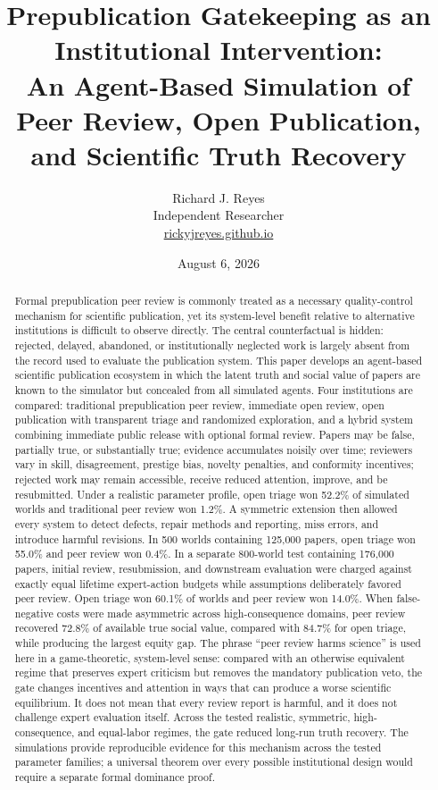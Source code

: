 \documentclass[11pt]{article}
\title{\textbf{Prepublication Gatekeeping as an Institutional Intervention:}\\
An Agent-Based Simulation of Peer Review, Open Publication, and Scientific Truth Recovery}
\author{Richard J. Reyes\\
Independent Researcher\\
\href{https://rickyjreyes.github.io}{rickyjreyes.github.io}}
\date{August 6, 2026}
\begin{document}
\maketitle

\begin{abstract}
Formal prepublication peer review is commonly treated as a necessary quality-control mechanism for scientific publication, yet its system-level benefit relative to alternative institutions is difficult to observe directly. The central counterfactual is hidden: rejected, delayed, abandoned, or institutionally neglected work is largely absent from the record used to evaluate the publication system. This paper develops an agent-based scientific publication ecosystem in which the latent truth and social value of papers are known to the simulator but concealed from all simulated agents. Four institutions are compared: traditional prepublication peer review, immediate open review, open publication with transparent triage and randomized exploration, and a hybrid system combining immediate public release with optional formal review. Papers may be false, partially true, or substantially true; evidence accumulates noisily over time; reviewers vary in skill, disagreement, prestige bias, novelty penalties, and conformity incentives; rejected work may remain accessible, receive reduced attention, improve, and be resubmitted. Under a realistic parameter profile, open triage won 52.2\% of simulated worlds and traditional peer review won 1.2\%. A symmetric extension then allowed every system to detect defects, repair methods and reporting, miss errors, and introduce harmful revisions. In 500 worlds containing 125,000 papers, open triage won 55.0\% and peer review won 0.4\%. In a separate 800-world test containing 176,000 papers, initial review, resubmission, and downstream evaluation were charged against exactly equal lifetime expert-action budgets while assumptions deliberately favored peer review. Open triage won 60.1\% of worlds and peer review won 14.0\%. When false-negative costs were made asymmetric across high-consequence domains, peer review recovered 72.8\% of available true social value, compared with 84.7\% for open triage, while producing the largest equity gap. The phrase ``peer review harms science'' is used here in a game-theoretic, system-level sense: compared with an otherwise equivalent regime that preserves expert criticism but removes the mandatory publication veto, the gate changes incentives and attention in ways that can produce a worse scientific equilibrium. It does not mean that every review report is harmful, and it does not challenge expert evaluation itself. Across the tested realistic, symmetric, high-consequence, and equal-labor regimes, the gate reduced long-run truth recovery. The simulations provide reproducible evidence for this mechanism across the tested parameter families; a universal theorem over every possible institutional design would require a separate formal dominance proof.
\end{abstract}
\end{document}

